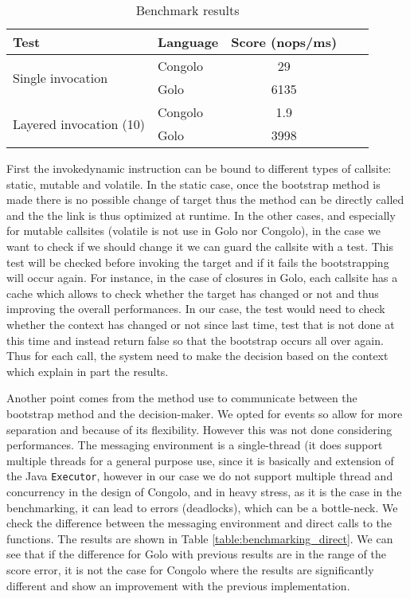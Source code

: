 \documentclass{sig-alternate}
\begin{document}
\begin{table}
\begin{adjustbox}{center}
\begin{tabular}{l p{2cm} | c | c | c | }
        \hline
                Test & Language & Score (nops/ms) \\
                
        \hline
        \multirow{2}{*}{Single invocation} 
                & Congolo & 29 \\
                & Golo & 6135 \\

        \hline
    \multirow{2}{*}{Layered invocation (10)} 
                & Congolo & 1.9 \\
                & Golo & 3998\\                 
\end{tabular}
\end{adjustbox}
        \caption{Benchmark results}
        \label{table:benchmarking}
\end{table}

First the invokedynamic instruction can be bound to different types of callsite: static, mutable and volatile. In the static case, once the bootstrap method is made there is no possible change of target thus the method can be directly called and the the link is thus optimized at runtime. In the other cases, and especially for mutable callsites (volatile is not use in Golo nor Congolo), in the case we want to check if we should change it we can guard the callsite with a test. This test will be checked before invoking the target and if it fails the bootstrapping will occur again. For instance, in the case of closures in Golo, each callsite has a cache which allows to check whether the target has changed or not and thus improving the overall performances. In our case, the test would need to check whether the context has changed or not since last time, test that is not done at this time and instead return false so that the bootstrap occurs all over again. Thus for each call, the system need to make the decision based on the context which explain in part the results.

Another point comes from the method use to communicate between the bootstrap method and the decision-maker. We opted for events so allow for more separation and because of its flexibility. However this was not done considering performances. The messaging environment is a single-thread (it does support multiple threads for a general purpose use, since it is basically and extension of the Java \lstinline|Executor|, however in our case we do not support multiple thread and concurrency in the design of Congolo, and in heavy stress, as it is the case in the benchmarking, it can lead to errors (deadlocks), which can be a bottle-neck. We check the difference between the messaging environment and direct calls to the functions. The results are shown in Table \ref{table:benchmarking_direct}. We can see that if the difference for Golo with previous results are in the range of the score error, it is not the case for Congolo where the results are significantly different and show an improvement with the previous implementation.
\end{document}
